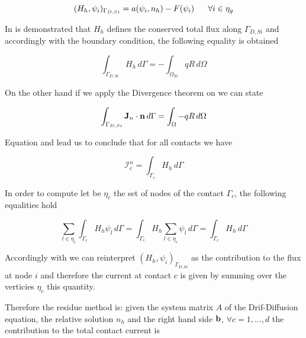 \begin{equation}
\label{eq: flux problem complete}
(H_h,\psi_i)_{\Gamma_{D,Si}} = a(\psi_i,n_h)-F(\psi_i) \psp{10} \forall i \in \eta_g 
\end{equation} 


In \cite{GalerkMethConsHughes} is demonstrated that $H_h$ defines the conserved total flux along $\Gamma_{D,Si}$ and accordingly with the boundary condition, the following equality is obtained

\begin{equation}
\label{eq: conservative flux}
\int_{\Gamma_{D,Si}} H_h \, d\Gamma = - \int_{\Omega_{Si}} qR \, d \Omega
\end{equation}


On the other hand if we apply the Divergence theorem on  we can state 

\begin{equation}
\label{eq: lec divergence theor}
\int_{\Gamma_{D,Si}} \mathbf{J}_n \cdot \mathbf{n} \, d\Gamma = \int_{\Omega} - qR \, d\Omega
\end{equation}

Equation  and   lead us to conclude that for all contacts we have

\begin{equation}
\label{eq: flux current formula}
\mathcal{I}_c^n = \int_{\Gamma_c} H_h \, d\Gamma
\end{equation}

In order to compute  let be $\eta_{c}$ the set of nodes of the contact $\Gamma_c$, the following equalities hold

\begin{equation}
\label{eq: equalities integrals}
\sum_{l \in \eta_c} \int_{\Gamma_c} H_h \psi_l \, d\Gamma 
=  \int_{\Gamma_c} H_h \sum_{l \in \eta_{c}} \psi_l \,d\Gamma 
= \int_{\Gamma_c} H_h \, d\Gamma
\end{equation}


Accordingly with   we can reinterpret $(H_h,\psi_i)_{\Gamma_{D,Si}}$ as the contribution to the flux at node $i$ and therefore the current at contact $c$ is given by summing over the verticies $\eta_{c}$ this quantity.

Therefore the residue method is:
given the system matrix $A$ of the Drif-Diffusion equation, the relative solution $n_h$ and the right hand side $\mathbf{b}$, $\forall c = 1,...,d$ the contribution to the total contact current is

